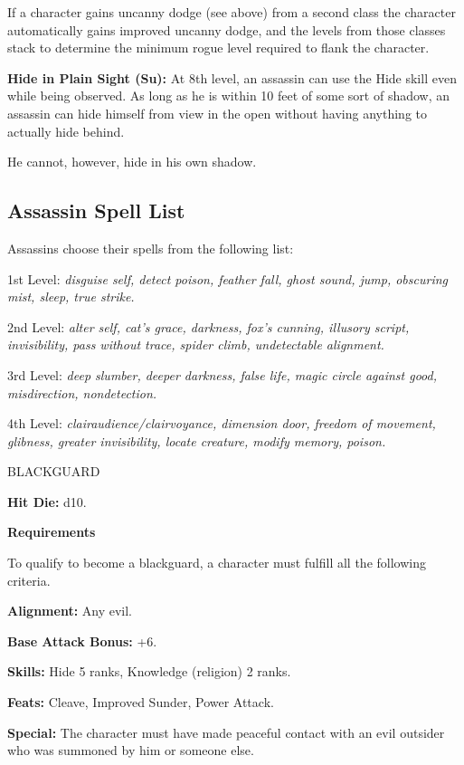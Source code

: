 \documentclass{article}
\begin{document}
If a character gains uncanny dodge (see above) from a second class the character 
automatically gains improved uncanny dodge, and the levels from those classes stack 
to determine the minimum rogue level required to flank the character.

\textbf{Hide in Plain Sight (Su):} At 8th level, an assassin can use the Hide skill 
even while being observed. As long as he is within 10 feet of some sort of shadow, 
an assassin can hide himself from view in the open without having anything to actually 
hide behind.

He cannot, however, hide in his own shadow.

\subsection*{\textbf{Assassin Spell List}}

Assassins choose their spells from the following list:

1st Level: \textit{disguise self, detect poison, feather fall, ghost sound, jump, 
obscuring mist, sleep, true strike.}

2nd Level: \textit{alter self, cat's grace, darkness, fox's cunning, illusory script, 
invisibility, pass without trace, spider climb, undetectable alignment.}

3rd Level: \textit{deep slumber, deeper darkness, false life, magic circle against 
good, misdirection, nondetection.}

4th Level: \textit{clairaudience/clairvoyance, dimension door, freedom of movement, 
glibness, greater invisibility, locate creature, modify memory, poison.}

\vspace{12pt}
BLACKGUARD

\textbf{Hit Die:} d10.

\textbf{Requirements}

To qualify to become a blackguard, a character must fulfill all the following criteria.

\textbf{Alignment:} Any evil.

\textbf{Base Attack Bonus:} +6. 

\parindent=3pt
\textbf{Skills:} Hide 5 ranks, Knowledge (religion) 2 ranks. 

\parindent=0pt
\textbf{Feats:} Cleave, Improved Sunder, Power Attack.

\textbf{Special:} The character must have made peaceful contact with an evil outsider 
who was summoned by him or someone else.
\end{document}
